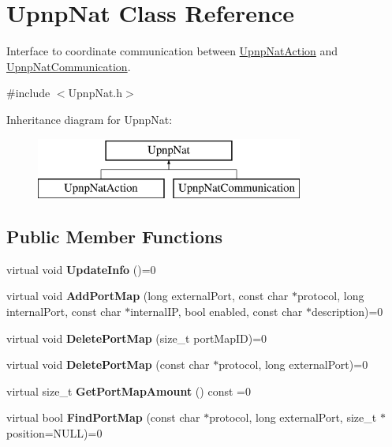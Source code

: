\hypertarget{class_upnp_nat}{
\section{UpnpNat Class Reference}
\label{class_upnp_nat}
}


Interface to coordinate communication between \hyperlink{class_upnp_nat_action}{UpnpNatAction} and \hyperlink{class_upnp_nat_communication}{UpnpNatCommunication}.  




{\ttfamily \#include $<$UpnpNat.h$>$}

Inheritance diagram for UpnpNat:\begin{figure}[H]
\begin{center}
\leavevmode
\includegraphics[height=2.000000cm]{class_upnp_nat}
\end{center}
\end{figure}
\subsection*{Public Member Functions}
\begin{DoxyCompactItemize}
\item 
\hypertarget{class_upnp_nat_a6b0ab324e2ac0c701bd00f79a44ed05e}{
virtual void {\bfseries UpdateInfo} ()=0}
\label{class_upnp_nat_a6b0ab324e2ac0c701bd00f79a44ed05e}

\item 
\hypertarget{class_upnp_nat_abad54b3d87df8d40fb9aa990aff93a1c}{
virtual void {\bfseries AddPortMap} (long externalPort, const char $\ast$protocol, long internalPort, const char $\ast$internalIP, bool enabled, const char $\ast$description)=0}
\label{class_upnp_nat_abad54b3d87df8d40fb9aa990aff93a1c}

\item 
\hypertarget{class_upnp_nat_af87bdaa605cba04c40265f7a6043ee1c}{
virtual void {\bfseries DeletePortMap} (size\_\-t portMapID)=0}
\label{class_upnp_nat_af87bdaa605cba04c40265f7a6043ee1c}

\item 
\hypertarget{class_upnp_nat_a5fc781a6c34caaaafa3430bdcf87564e}{
virtual void {\bfseries DeletePortMap} (const char $\ast$protocol, long externalPort)=0}
\label{class_upnp_nat_a5fc781a6c34caaaafa3430bdcf87564e}

\item 
\hypertarget{class_upnp_nat_af34429a4813ee0169fc1ef8ec859aa0a}{
virtual size\_\-t {\bfseries GetPortMapAmount} () const =0}
\label{class_upnp_nat_af34429a4813ee0169fc1ef8ec859aa0a}

\item 
\hypertarget{class_upnp_nat_a7987a780ea99752396fc7c42562b7f02}{
virtual bool {\bfseries FindPortMap} (const char $\ast$protocol, long externalPort, size\_\-t $\ast$position=NULL)=0}
\label{class_upnp_nat_a7987a780ea99752396fc7c42562b7f02}

\end{DoxyCompactItemize}


